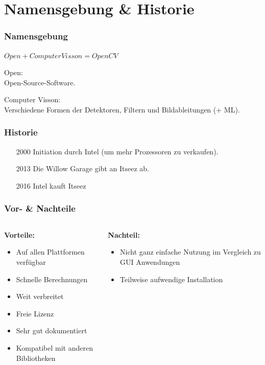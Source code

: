 \documentclass{beamer}
\begin{document}
\begin{frame}
\titlepage
\end{frame}

\section{Namensgebung \& Historie}
\begin{frame} \frametitle{Namensgebung}
	$Open + Computer Visson = OpenCV$ \pause
	\begin{description}
		\item Open:\\
		 Open-Source-Software.\pause
		\item Computer Visson:\\
		 Verschiedene Formen der Detektoren, Filtern und Bildableitungen (+ ML).
	\end{description}
\cite{Bradski2008}
\end{frame}

\begin{frame} \frametitle{Historie}
	\begin{itemize}
		\item [2000] Initiation durch Intel (um mehr Prozessoren zu verkaufen). \pause
		\item [2013] Die Willow Garage gibt an Itseez ab. \pause
		\item [2016] Intel kauft Itseez 
	\end{itemize}
	\cite{Bradski2008}
\end{frame}

\begin{frame} \frametitle{Vor- \& Nachteile}
\begin{columns}
	\begin{column}{0.5\textwidth}
		\textbf{Vorteile:}
		\begin{itemize}
			\item Auf allen Plattformen verfügbar
			\item Schnelle Berechnungen
			\item Weit verbreitet
			\item Freie Lizenz
			\item Sehr gut dokumentiert
			\item Kompatibel mit anderen Bibliotheken
		\end{itemize}
	\end{column}
	
	
	\begin{column}{0.5\textwidth}
	\textbf{Nachteil:}
	\begin{itemize}
		\item Nicht ganz einfache Nutzung im Vergleich zu GUI Anwendungen
		\item Teilweise aufwendige Installation
	\end{itemize}
\end{column}
\end{columns}
\end{frame}
\end{document}
